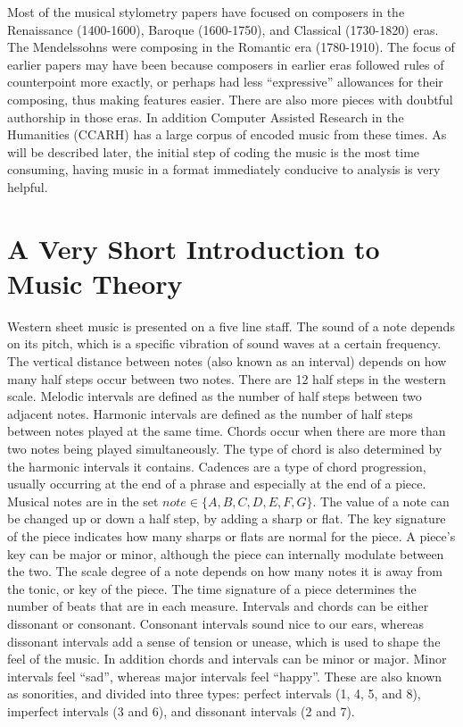 \documentclass[12pt,twoside]{reedthesis}
\theoremstyle{definition}
\theoremstyle{definition}
\theoremstyle{definition}
\theoremstyle{remark}
\begin{document}
Most of the musical stylometry papers have focused on composers in the
Renaissance (1400-1600), Baroque (1600-1750), and Classical (1730-1820)
eras. The Mendelssohns were composing in the Romantic era (1780-1910).
The focus of earlier papers may have been because composers in earlier
eras followed rules of counterpoint more exactly, or perhaps had less
``expressive'' allowances for their composing, thus making features
easier. There are also more pieces with doubtful authorship in those
eras. In addition Computer Assisted Research in the Humanities (CCARH)
has a large corpus of encoded music from these times. As will be
described later, the initial step of coding the music is the most time
consuming, having music in a format immediately conducive to analysis is
very helpful.

\section{A Very Short Introduction to Music
Theory}\label{a-very-short-introduction-to-music-theory}

Western sheet music is presented on a five line staff. The sound of a
note depends on its pitch, which is a specific vibration of sound waves
at a certain frequency. The vertical distance between notes (also known
as an interval) depends on how many half steps occur between two notes.
There are 12 half steps in the western scale. Melodic intervals are
defined as the number of half steps between two adjacent notes. Harmonic
intervals are defined as the number of half steps between notes played
at the same time. Chords occur when there are more than two notes being
played simultaneously. The type of chord is also determined by the
harmonic intervals it contains. Cadences are a type of chord
progression, usually occurring at the end of a phrase and especially at
the end of a piece. Musical notes are in the set
\(note \in \{A,B,C,D,E,F,G\}\). The value of a note can be changed up or
down a half step, by adding a sharp or flat. The key signature of the
piece indicates how many sharps or flats are normal for the piece. A
piece's key can be major or minor, although the piece can internally
modulate between the two. The scale degree of a note depends on how many
notes it is away from the tonic, or key of the piece. The time signature
of a piece determines the number of beats that are in each measure.
Intervals and chords can be either dissonant or consonant. Consonant
intervals sound nice to our ears, whereas dissonant intervals add a
sense of tension or unease, which is used to shape the feel of the
music. In addition chords and intervals can be minor or major. Minor
intervals feel ``sad'', whereas major intervals feel ``happy''. These
are also known as sonorities, and divided into three types: perfect
intervals (1, 4, 5, and 8), imperfect intervals (3 and 6), and dissonant
intervals (2 and 7).
\end{document}
